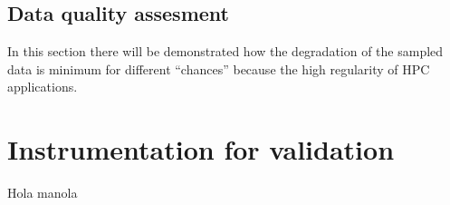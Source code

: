 \subsection{Data quality assesment}\label{ann:loops_data_quality}


In this section there will be demonstrated how the degradation of the sampled
data is minimum for different ``chances'' because the high regularity of HPC
applications.

\section{Instrumentation for validation}

Hola manola

